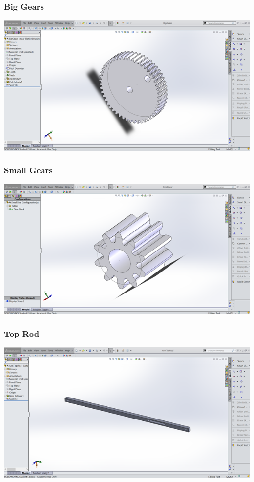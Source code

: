 \documentclass[12pt]{article}
\begin{document}
\subsubsection{Big Gears}
\includegraphics{gear}
\subsubsection{Small Gears} 
\includegraphics{gear-small}
\subsubsection{Top Rod}
\includegraphics{top-rod}  
\end{document}
